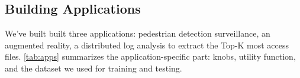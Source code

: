




\subsection{Building Applications}
\label{sec:build-appl}

We've built built three applications: pedestrian detection surveillance, an
augmented reality, a distributed log analysis to extract the Top-K most access
files. \autoref{tab:apps} summarizes the application-specific part: knobs,
utility function, and the dataset we used for training and testing.


